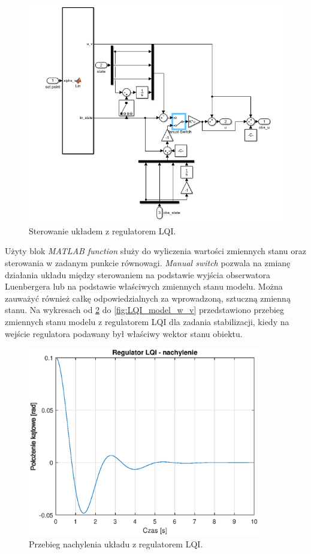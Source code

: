 \documentclass[11pt,a4paper]{article}
\begin{document}
\begin{figure}[H]
	\centering
	\includegraphics[width=5.9in]{Figures/helikopter_lqi.png}
	\caption{Sterowanie układem z regulatorem LQI.}
	\label{fig:helikopter_lqi}
\end{figure}

Użyty blok \textit{MATLAB function} służy do wyliczenia wartości zmiennych stanu oraz sterowania w zadanym punkcie równowagi. \textit{Manual switch} pozwala na zmianę działania układu między sterowaniem na podstawie wyjścia obserwatora Luenbergera lub na podstawie właściwych zmiennych stanu modelu. Można zauważyć również całkę odpowiedzialnych za wprowadzoną, sztuczną zmienną stanu. Na wykresach od \ref{fig:LQI_model_alpha_v} do \ref{fig:LQI_model_w_v} przedstawiono przebieg zmiennych stanu modelu z regulatorem LQI dla zadania stabilizacji, kiedy na wejście regulatora podawany był właściwy wektor stanu obiektu.

\begin{figure}[H]
	\centering
	\includegraphics[width=4in]{Figures/LQI_model_alpha_v.eps}
	\caption{Przebieg nachylenia układu z regulatorem LQI.}
	\label{fig:LQI_model_alpha_v}
\end{figure}
\end{document}
